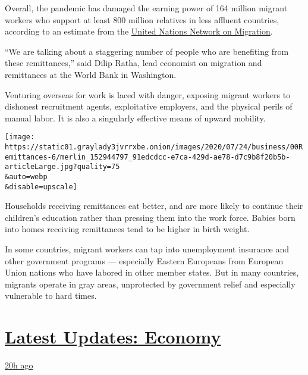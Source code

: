 Overall, the pandemic has damaged the earning power of 164 million
migrant workers who support at least 800 million relatives in less
affluent countries, according to an estimate from the
\href{https://migrationnetwork.un.org/sites/default/files/policy_brief-_remittances_in_the_time_of_covid-19.pdf}{United
Nations Network on Migration}.

``We are talking about a staggering number of people who are benefiting
from these remittances,'' said Dilip Ratha, lead economist on migration
and remittances at the World Bank in Washington.

Venturing overseas for work is laced with danger, exposing migrant
workers to dishonest recruitment agents, exploitative employers, and the
physical perils of manual labor. It is also a singularly effective means
of upward mobility.

\texttt{[image: https://static01.graylady3jvrrxbe.onion/images/2020/07/24/business/00Remittances-6/merlin\_152944797\_91edcdcc-e7ca-429d-ae78-d7c9b8f20b5b-articleLarge.jpg?quality=75\\\&auto=webp\\\&disable=upscale]}

Households receiving remittances eat better, and are more likely to
continue their children's education rather than pressing them into the
work force. Babies born into homes receiving remittances tend to be
higher in birth weight.

In some countries, migrant workers can tap into unemployment insurance
and other government programs --- especially Eastern Europeans from
European Union nations who have labored in other member states. But in
many countries, migrants operate in gray areas, unprotected by
government relief and especially vulnerable to hard times.

\hypertarget{latest-updates-economy}{%
\section{\texorpdfstring{\href{https://www.nytimes3xbfgragh.onion/live/2020/07/31/business/stock-market-today-coronavirus?action=click\&pgtype=Article\&state=default\&region=MAIN_CONTENT_1\&context=storylines_live_updates}{Latest
Updates:
Economy}}{Latest Updates: Economy}}\label{latest-updates-economy}}

\href{https://www.nytimes3xbfgragh.onion/live/2020/07/31/business/stock-market-today-coronavirus?action=click\&pgtype=Article\&state=default\&region=MAIN_CONTENT_1\&context=storylines_live_updates\#kodaks-chief-executive-was-given-stock-options-then-the-share-price-spiked-1000-percent}{20h
ago}

